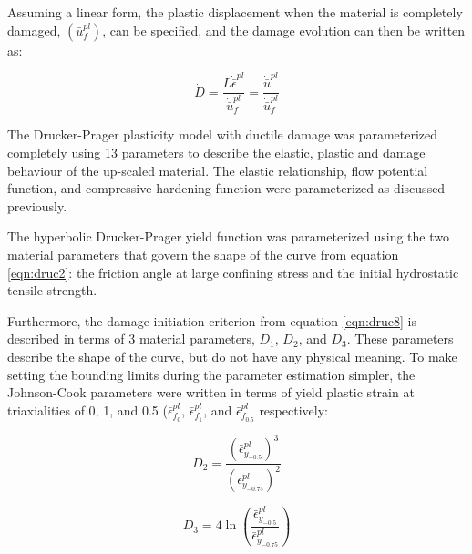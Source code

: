 Assuming a linear form, the plastic displacement when the material is completely damaged, $(\bar{u}^{pl}_f)$, can be specified, and the damage evolution can then be written as:

\begin{equation}
\dot{D}=\frac{L\dot{\bar{\epsilon}}^{pl}}{\dot{\bar{u}}_{f}^{pl}}=\frac{\dot{\bar{u}}^{pl}}{\dot{\bar{u}}_{f}^{pl}}\label{eqn:druc9-1}
\end{equation}

The Drucker-Prager plasticity model with ductile damage was parameterized completely using 13 parameters to describe the elastic, plastic and damage behaviour of the up-scaled material. The elastic relationship, flow potential function, and compressive hardening function were parameterized as discussed previously. 

The hyperbolic Drucker-Prager yield function was parameterized using the two material parameters that govern the shape of the curve from equation \ref{eqn:druc2}: the friction angle at large confining stress and the initial hydrostatic tensile strength.




Furthermore, the damage initiation criterion from equation \ref{eqn:druc8} is described in terms of 3 material parameters, $D_1$, $D_2$, and $D_3$. These parameters describe the shape of the curve, but do not have any physical meaning. To make setting the bounding limits during the parameter estimation simpler, the Johnson-Cook parameters were written in terms of yield plastic strain at triaxialities of 0, 1, and 0.5 ($\bar{\epsilon}^{pl}_{f_0}$, $\bar{\epsilon}^{pl}_{f_1}$, and $\bar{\epsilon}^{pl}_{f_{0.5}}$ respectively:

\begin{equation}
D_2=\frac{\left(\bar{\epsilon}^{pl}_{y_{-0.5}}\right)^3}{\left(\bar{\epsilon}^{pl}_{y_{-0.75}}\right)^2}
\label{eqn:dparam8}
\end{equation}

\begin{equation}
D_3=4\ln \left (\frac{\bar{\epsilon}^{pl}_{y_{-0.5}}}{\bar{\epsilon}^{pl}_{y_{-0.75}}}\right )
\label{eqn:dparam9}
\end{equation}